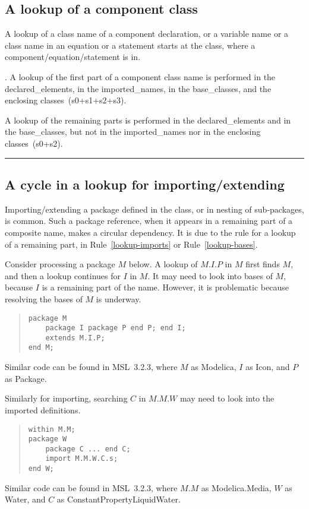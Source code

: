 \documentclass[10pt,b5paper]{article}
\newcounter{ruleno}
\def\tombstone{\rule[-.2ex]{.3em}{1.8ex}}
\newenvironment{widequote}{%
\list{}{\leftmargin=0mm\rightmargin=\leftmargin}%
\item\relax}{\endlist}
\def\rulelead{\refstepcounter{ruleno}{\bf{}Rule~\arabic{ruleno}}.}
\newenvironment{QRULE}{\begin{widequote}\rulelead}%
{\unskip\nobreakspace\tombstone\end{widequote}\ignorespacesafterend}
\begin{document}

\subsection{A lookup of a component class}

A lookup of a class name of a component declaration, or a variable
name or a class name in an equation or a statement starts at the
class, where a component/equation/statement is in.

\begin{QRULE}\label{lookup-components} A lookup of the first part of a
component class name is performed in the declared_elements, in the
imported_names, in the base_classes, and the enclosing
classes~(s0+s1+s2+s3).

A lookup of the remaining parts is performed in the declared_elements
and in the base_classes, but not in the imported_names nor in the
enclosing classes~(s0+s2).
\end{QRULE}


\subsection{A cycle in a lookup for importing/extending}
\label{sec:lookup-cycle}

Importing/extending a package defined in the class, or in nesting of
sub-packages, is common.  Such a package reference, when it appears in
a remaining part of a composite name, makes a circular dependency.  It
is due to the rule for a lookup of a remaining part, in
Rule~\ref{lookup-imports} or Rule~\ref{lookup-bases}.

Consider processing a package $M$ below.  A lookup of $M.I.P$ in $M$
first finds $M$, and then a lookup continues for $I$ in $M$.  It may
need to look into bases of $M$, because $I$ is a remaining part of the
name.  However, it is problematic because resolving the bases of $M$
is underway.
\begin{quote}
\begin{lstlisting}[aboveskip=-\baselineskip]
package M
    package I package P end P; end I;
    extends M.I.P;
end M;
\end{lstlisting}
\end{quote}
Similar code can be found in MSL~3.2.3, where $M$ as Modelica, $I$ as
Icon, and $P$ as Package.

Similarly for importing, searching $C$ in $M.M.W$ may need to look
into the imported definitions.
\begin{quote}
\begin{lstlisting}[aboveskip=-\baselineskip]
within M.M;
package W
    package C ... end C;
    import M.M.W.C.s;
end W;
\end{lstlisting}
\end{quote}
Similar code can be found in MSL~3.2.3, where $M.M$ as Modelica.Media,
$W$ as Water, and $C$ as ConstantPropertyLiquidWater.
\end{document}

